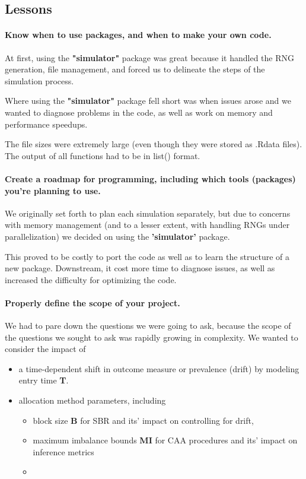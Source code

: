 \subsection{Lessons}
\paragraph{Know when to use packages, and when to make your own code.} At first, using the \textbf{"simulator"} package was great because it handled the RNG generation, file management, and forced us to delineate the steps of the simulation process.

Where using the \textbf{"simulator"} package fell short was when issues arose and we wanted to diagnose problems in the code, as well as work on memory and performance speedups. 

The file sizes were extremely large (even though they were stored as .Rdata files).
The output of all functions had to be in list() format.

\paragraph{Create a roadmap for programming, including which tools (packages) you're planning to use.} We originally set forth to plan each simulation separately, but due to concerns with memory management (and to a lesser extent,  with handling RNGs under parallelization) we decided on using the \textbf{'simulator'} package.

This proved to be costly to port the code as well as to learn the structure of a new package.  
Downstream, it cost more time to diagnose issues, as well as increased the difficulty for optimizing the code.

\paragraph{Properly define the scope of your project.}
We had to pare down the questions we were going to ask, because the scope of the questions we sought to ask was rapidly growing in complexity.
We wanted to consider the impact of
\begin{itemize}
	\item a time-dependent shift in outcome measure or prevalence (drift) by modeling entry time \textbf{T}. 
	\item allocation method parameters, including
	\begin{itemize}
		\item block size \textbf{B} for SBR and its' impact on controlling for drift,
		\item maximum imbalance bounds \textbf{MI} for CAA procedures and its' impact on inference metrics
		\item 	
	\end{itemize}
\end{itemize}

